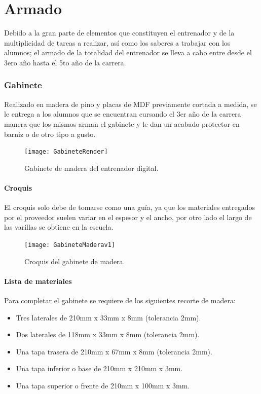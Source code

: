 \part{Armado}
Debido a la gran parte de elementos que constituyen el entrenador y de la multiplicidad de tareas a realizar, así como los saberes a trabajar con los alumnos; el armado de la totalidad del entrenador se lleva a cabo entre desde el 3ero año hasta el 5to año de la carrera.   
\section{Gabinete}
\begin{multicols}{2}
Realizado en madera de pino y placas de MDF previamente cortada a medida, se le entrega a los alumnos que se encuentran cursando el 3er año de la carrera manera que los mismos arman el gabinete y le dan un acabado protector en barniz o de otro tipo a gusto.
\begin{figure}[H]
	\texttt{[image: GabineteRender]}\caption{Gabinete de madera del entrenador digital.}\label{GabineteRender}

\end{figure}

\end{multicols}
\subsection{Croquis}
El croquis solo debe de tomarse como una guía, ya que los materiales entregados por el proveedor suelen variar en el espesor y el ancho, por otro lado el largo de las varillas se obtiene en la escuela. 

\begin{figure}[ht]
\texttt{[image: GabineteMaderav1]}\caption{Croquis del gabinete de madera.}\label{CroquisdelGabinetedeMadera}
\end{figure}
\subsection{Lista de materiales}
Para completar el gabinete se requiere de los siguientes recorte de madera:
\begin{itemize}
	\item Tres laterales de 210mm x 33mm x 8mm (tolerancia 2mm).
	\item Dos laterales de 118mm x 33mm x 8mm (tolerancia 2mm).
	\item Una tapa trasera de 210mm x 67mm x 8mm (tolerancia 2mm).
	\item Una tapa inferior o base de 210mm x 210mm x 3mm.
	\item Una tapa superior o frente de 210mm x 100mm x 3mm.
	 
\end{itemize}

